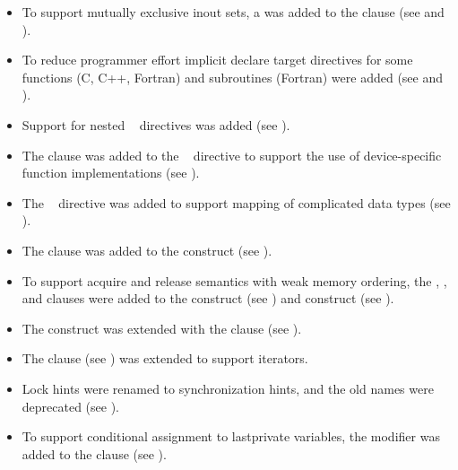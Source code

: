 \begin{itemize}
\item To support mutually exclusive inout sets, a 
       was added to the  clause (see
       and ).

\item To reduce programmer effort implicit declare target directives for
      some functions (C, C++, Fortran) and subroutines (Fortran) were added
      (see  and
      ).

\item Support for nested ~ directives was added
      (see ).

\item The  clause was added to the
      ~ directive to support the use of
      device-specific function implementations (see
      ).

\item The ~ directive was added to support
      mapping of complicated data types (see
      ).

\item The  clause was added to the  construct
      (see ).

\item To support acquire and release semantics with weak memory ordering, the
      , , and  clauses were added to
      the  construct (see ) and
       construct (see ).

\item The  construct was extended with the  clause
      (see ).

\item The  clause (see ) was
      extended to support iterators.

\item Lock hints were renamed to synchronization hints, and the
      old names were deprecated (see ).

\item To support conditional assignment to lastprivate variables, the
       modifier was added to the 
      clause (see ).


\end{itemize}
